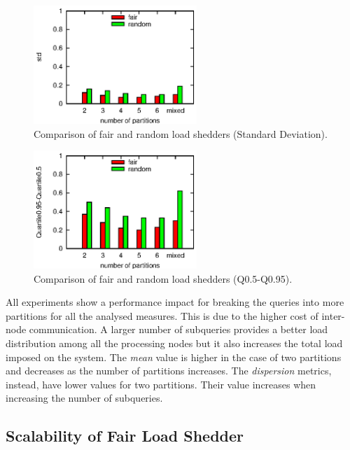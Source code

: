 \begin{figure}[h]
\centering
\includegraphics[width=0.55\textwidth]{img/tesi/std}
\caption{Comparison of fair and random load shedders (Standard Deviation). }
\label{fig:std}
\end{figure}
\begin{figure}[h!]
\centering
\includegraphics[width=0.55\textwidth]{img/tesi/maxmin}
\caption{Comparison of fair and random load shedders (Q0.5-Q0.95).}
\label{fig:qq}
\end{figure}
\clearpage
All experiments show a performance impact for breaking the queries into more partitions for all the analysed
measures. This is due to the higher cost of inter-node communication. A larger number of subqueries
provides a better load distribution among all the processing nodes but it also increases the total load
imposed on the system. The \emph{mean} \sic value is higher in the case of two partitions and decreases
as the number of partitions increases. The \emph{dispersion} metrics, instead, have lower values for two
partitions. Their value increases when increasing the number of subqueries.


\subsection*{Scalability of Fair Load Shedder }

